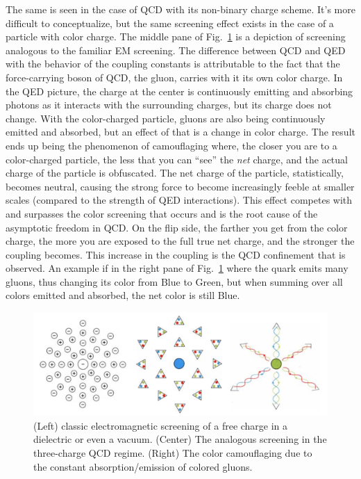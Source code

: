 The same is seen in the case of QCD with its non-binary charge scheme. It's more difficult to conceptualize, but the same screening effect exists in the case of a particle with color charge. The middle pane of Fig.~\ref{fig:screening-camo} is a depiction of screening analogous to the familiar EM screening. The difference between QCD and QED with the behavior of the coupling constants is attributable to the fact that the force-carrying boson of QCD, the gluon, carries with it its own color charge. In the QED picture, the charge at the center is continuously emitting and absorbing photons as it interacts with the surrounding charges, but its charge does not change. With the color-charged particle, gluons are also being continuously emitted and absorbed, but an effect of that is a change in color charge. The result ends up being the phenomenon of camouflaging where, the closer you are to a color-charged particle, the less that you can ``see'' the \emph{net} charge, and the actual charge of the particle is obfuscated. The net charge of the particle, statistically, becomes neutral, causing the strong force to become increasingly feeble at smaller scales (compared to the strength of QED interactions). This effect competes with and surpasses the color screening that occurs and is the root cause of the asymptotic freedom in QCD. On the flip side, the farther you get from the color charge, the more you are exposed to the full true net charge, and the stronger the coupling becomes. This increase in the coupling is the QCD confinement that is observed. An example if in the right pane of Fig.~\ref{fig:screening-camo} where the quark emits many gluons, thus changing its color from Blue to Green, but when summing over all colors emitted and absorbed, the net color is still Blue.

\begin{figure}
	\centering
	\includegraphics[width=\textwidth]{figures/background/screening-camo.png}
	\caption{(Left) classic electromagnetic screening of a free charge in a dielectric or even a vacuum. (Center) The analogous screening in the three-charge QCD regime. (Right) The color camouflaging due to the constant absorption/emission of colored gluons\cite{Quigg:1985ai}.}
	\label{fig:screening-camo}
\end{figure}

